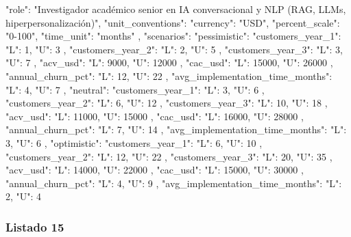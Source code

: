 \begin{APACode}
{
  "role": "Investigador académico senior en IA conversacional y NLP (RAG, LLMs, hiperpersonalización)",
  "unit_conventions": {
    "currency": "USD",
    "percent_scale": "0-100",
    "time_unit": "months"
  },
  "scenarios": {
    "pessimistic": {
      "customers_year_1": {
        "L": 1,
        "U": 3
      },
      "customers_year_2": {
        "L": 2,
        "U": 5
      },
      "customers_year_3": {
        "L": 3,
        "U": 7
      },
      "acv_usd": {
        "L": 9000,
        "U": 12000
      },
      "cac_usd": {
        "L": 15000,
        "U": 26000
      },
      "annual_churn_pct": {
        "L": 12,
        "U": 22
      },
      "avg_implementation_time_months": {
        "L": 4,
        "U": 7
      }
    },
    "neutral": {
      "customers_year_1": {
        "L": 3,
        "U": 6
      },
      "customers_year_2": {
        "L": 6,
        "U": 12
      },
      "customers_year_3": {
        "L": 10,
        "U": 18
      },
      "acv_usd": {
        "L": 11000,
        "U": 15000
      },
      "cac_usd": {
        "L": 16000,
        "U": 28000
      },
      "annual_churn_pct": {
        "L": 7,
        "U": 14
      },
      "avg_implementation_time_months": {
        "L": 3,
        "U": 6
      }
    },
    "optimistic": {
      "customers_year_1": {
        "L": 6,
        "U": 10
      },
      "customers_year_2": {
        "L": 12,
        "U": 22
      },
      "customers_year_3": {
        "L": 20,
        "U": 35
      },
      "acv_usd": {
        "L": 14000,
        "U": 22000
      },
      "cac_usd": {
        "L": 15000,
        "U": 30000
      },
      "annual_churn_pct": {
        "L": 4,
        "U": 9
      },
      "avg_implementation_time_months": {
        "L": 2,
        "U": 4
      }
    }
  }
}
\end{APACode}

\subsubsection{Listado 15}
\label{anexo:code-6-3-2-15}

